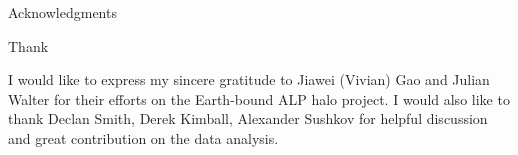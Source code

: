 


Acknowledgments


Thank 



I would like to express my sincere gratitude to Jiawei (Vivian) Gao and Julian Walter for their efforts on the Earth-bound ALP halo project. 
I would also like to thank Declan Smith, Derek Kimball, Alexander Sushkov for helpful discussion and great contribution on the data analysis. 